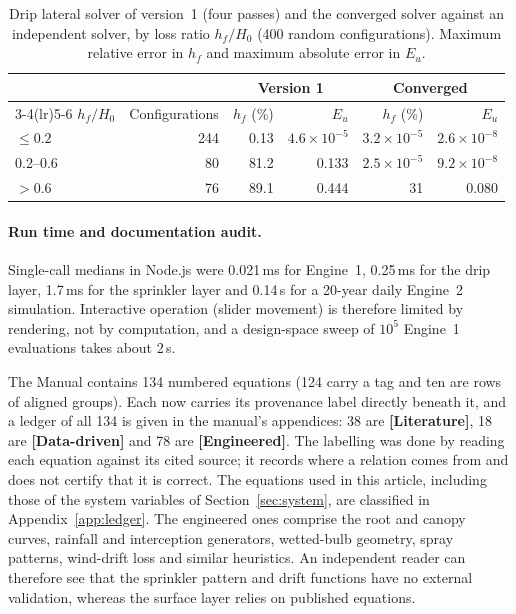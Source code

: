 \documentclass[preprint,12pt]{elsarticle}
\begin{document}
\begin{table}[H]\centering\small
\caption{Drip lateral solver of version~1 (four passes) and the converged solver against an independent solver, by loss ratio $h_f/H_0$ (400 random configurations). Maximum relative error in $h_f$ and maximum absolute error in $E_u$.}
\label{tab:drip}
\begin{tabular}{lrrrrr}
\toprule
 & & \multicolumn{2}{c}{Version 1} & \multicolumn{2}{c}{Converged}\\\cmidrule(lr){3-4}\cmidrule(lr){5-6}
$h_f/H_0$ & Configurations & $h_f$ (\%) & $E_u$ & $h_f$ (\%) & $E_u$\\\midrule
$\le0.2$ & 244 & 0.13 & $4.6\times10^{-5}$ & $3.2\times10^{-5}$ & $2.6\times10^{-8}$\\
0.2--0.6 & 80 & 81.2 & 0.133 & $2.5\times10^{-5}$ & $9.2\times10^{-8}$\\
$>0.6$ & 76 & 89.1 & 0.444 & 31 & 0.080\\\bottomrule
\end{tabular}
\end{table}


\paragraph{Run time and documentation audit.}
\label{sec:audit}
Single-call medians in Node.js were 0.021\,ms for Engine~1, 0.25\,ms for the drip layer, 1.7\,ms for the sprinkler layer and 0.14\,s for a 20-year daily Engine~2 simulation. Interactive operation (slider movement) is therefore limited by rendering, not by computation, and a design-space sweep of $10^5$ Engine~1 evaluations takes about 2\,s.

The Manual contains 134 numbered equations (124 carry a tag and ten are rows of aligned groups). Each now carries its provenance label directly beneath it, and a ledger of all 134 is given in the manual's appendices: 38 are \textbf{[Literature]}, 18 are \textbf{[Data-driven]} and 78 are \textbf{[Engineered]}. The labelling was done by reading each equation against its cited source; it records where a relation comes from and does not certify that it is correct. The equations used in this article, including those of the system variables of Section~\ref{sec:system}, are classified in Appendix~\ref{app:ledger}. The engineered ones comprise the root and canopy curves, rainfall and interception generators, wetted-bulb geometry, spray patterns, wind-drift loss and similar heuristics. An independent reader can therefore see that the sprinkler pattern and drift functions have no external validation, whereas the surface layer relies on published equations.
\end{document}
